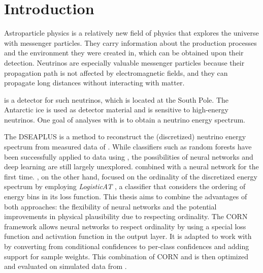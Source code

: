 \chapter{Introduction}
Astroparticle physics is a relatively new field of physics
  that explores the universe
    with messenger particles.
They carry information about
    the production processes
    and the environment they were created in,
  which can be obtained upon their detection.
Neutrinos are especially valuable messenger particles
  because their propagation path is not affected by electromagnetic fields,
  and they can propagate long distances without interacting with matter.


\icecube{} is a detector for such neutrinos,
  which is located at the South Pole.
The Antarctic ice is used as detector material
  and is sensitive to high-energy neutrinos. %
One goal of analyses with \icecube{} is
  to obtain a neutrino energy spectrum.

The \acf{DSEAPLUS} \cite{dsea_unification}
is a method to reconstruct the (discretized) neutrino energy spectrum
  from measured data of \icecube{}.
While classifiers such as random forests
have been successfully applied to \icecube{} data using \dsea{} \cite{hymon2021seasonal},
the possibilities of neural networks and deep learning are still largely unexplored. %
%
\citeauthor{dsea_samuel} \cite{dsea_samuel}
combined \dsea{} with a neural network for the first time.
%
\citeauthor{dsea_jan} \cite{dsea_jan},
  on the other hand,
focused on the ordinality of the discretized energy spectrum
  by employing \emph{LogisticAT} \cite{logisticat},
    a classifier
      that considers
        the ordering of energy bins
      in its loss function.
%
This thesis aims to combine the advantages of both approaches:
  the flexibility of neural networks
  and the potential improvements in physical plausibility
    due to respecting ordinality.
The \ac{CORN} framework \cite{corn}
  allows neural networks to respect ordinality
  by using a special
    loss function
    and activation function
      in the output layer.
It is adapted to work with \dsea{} by
  converting from conditional confidences to per-class confidences
  and adding support for sample weights.
This combination of \ac{CORN} and \dsea{}
is then optimized and evaluated
  on simulated data from \icecube{}.

